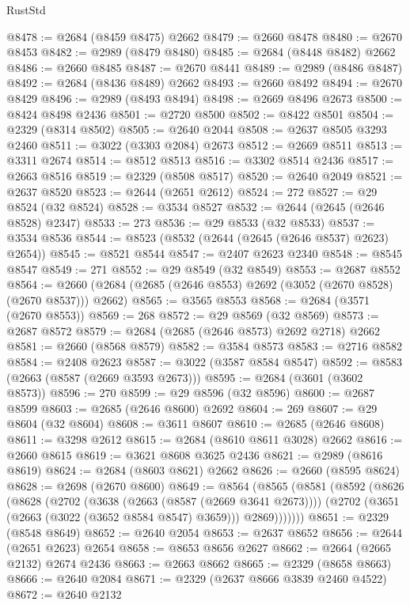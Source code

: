\begin{lexlean}{RustStd}
\begin{coremodule}
@8478 := @2684 (@8459 @8475) @2662
@8479 := @2660 @8478
@8480 := @2670 @8453
@8482 := @2989 (@8479 @8480)
@8485 := @2684 (@8448 @8482) @2662
@8486 := @2660 @8485
@8487 := @2670 @8441
@8489 := @2989 (@8486 @8487)
@8492 := @2684 (@8436 @8489) @2662
@8493 := @2660 @8492
@8494 := @2670 @8429
@8496 := @2989 (@8493 @8494)
@8498 := @2669 @8496 @2673
@8500 := @8424 @8498 @2436
@8501 := @2720 @8500
@8502 := @8422 @8501
@8504 := @2329 (@8314 @8502)
@8505 := @2640 @2044
@8508 := @2637 @8505 @3293 @2460
@8511 := @3022 (@3303 @2084) @2673
@8512 := @2669 @8511
@8513 := @3311 @2674
@8514 := @8512 @8513
@8516 := @3302 @8514 @2436
@8517 := @2663 @8516
@8519 := @2329 (@8508 @8517)
@8520 := @2640 @2049
@8521 := @2637 @8520
@8523 := @2644 (@2651 @2612)
@8524 := 272
@8527 := @29 @8524 (@32 @8524)
@8528 := @3534 @8527
@8532 := @2644 (@2645 (@2646 @8528) @2347)
@8533 := 273
@8536 := @29 @8533 (@32 @8533)
@8537 := @3534 @8536
@8544 := @8523 (@8532 (@2644 (@2645 (@2646 @8537) @2623) @2654))
@8545 := @8521 @8544
@8547 := @2407 @2623 @2340
@8548 := @8545 @8547
@8549 := 271
@8552 := @29 @8549 (@32 @8549)
@8553 := @2687 @8552
@8564 := @2660 (@2684 (@2685 (@2646 @8553) @2692 (@3052 (@2670 @8528) (@2670 @8537))) @2662)
@8565 := @3565 @8553
@8568 := @2684 (@3571 (@2670 @8553))
@8569 := 268
@8572 := @29 @8569 (@32 @8569)
@8573 := @2687 @8572
@8579 := @2684 (@2685 (@2646 @8573) @2692 @2718) @2662
@8581 := @2660 (@8568 @8579)
@8582 := @3584 @8573
@8583 := @2716 @8582
@8584 := @2408 @2623
@8587 := @3022 (@3587 @8584 @8547)
@8592 := @8583 (@2663 (@8587 (@2669 @3593 @2673)))
@8595 := @2684 (@3601 (@3602 @8573))
@8596 := 270
@8599 := @29 @8596 (@32 @8596)
@8600 := @2687 @8599
@8603 := @2685 (@2646 @8600) @2692
@8604 := 269
@8607 := @29 @8604 (@32 @8604)
@8608 := @3611 @8607
@8610 := @2685 (@2646 @8608)
@8611 := @3298 @2612
@8615 := @2684 (@8610 @8611 @3028) @2662
@8616 := @2660 @8615
@8619 := @3621 @8608 @3625 @2436
@8621 := @2989 (@8616 @8619)
@8624 := @2684 (@8603 @8621) @2662
@8626 := @2660 (@8595 @8624)
@8628 := @2698 (@2670 @8600)
@8649 := @8564
    (@8565
      (@8581
        (@8592
          (@8626
            (@8628
              (@2702
                (@3638 (@2663 (@8587 (@2669 @3641 @2673))))
                (@2702 (@3651 (@2663 (@3022 (@3652 @8584 @8547) @3659))) @2869)))))))
@8651 := @2329 (@8548 @8649)
@8652 := @2640 @2054
@8653 := @2637 @8652
@8656 := @2644 (@2651 @2623) @2654
@8658 := @8653 @8656 @2627
@8662 := @2664 (@2665 @2132) @2674 @2436
@8663 := @2663 @8662
@8665 := @2329 (@8658 @8663)
@8666 := @2640 @2084
@8671 := @2329 (@2637 @8666 @3839 @2460 @4522)
@8672 := @2640 @2132

\end{coremodule}
\end{lexlean}
